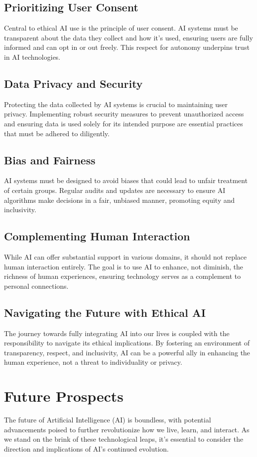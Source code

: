 \documentclass[12pt]{article}
\begin{document}
\subsection*{Prioritizing User Consent}
Central to ethical AI use is the principle of user consent. AI systems must be transparent about the data they collect and how it's used, ensuring users are fully informed and can opt in or out freely. This respect for autonomy underpins trust in AI technologies.

\subsection*{Data Privacy and Security}
Protecting the data collected by AI systems is crucial to maintaining user privacy. Implementing robust security measures to prevent unauthorized access and ensuring data is used solely for its intended purpose are essential practices that must be adhered to diligently.

\subsection*{Bias and Fairness}
AI systems must be designed to avoid biases that could lead to unfair treatment of certain groups. Regular audits and updates are necessary to ensure AI algorithms make decisions in a fair, unbiased manner, promoting equity and inclusivity.

\subsection*{Complementing Human Interaction}
While AI can offer substantial support in various domains, it should not replace human interaction entirely. The goal is to use AI to enhance, not diminish, the richness of human experiences, ensuring technology serves as a complement to personal connections.

\subsection*{Navigating the Future with Ethical AI}
The journey towards fully integrating AI into our lives is coupled with the responsibility to navigate its ethical implications. By fostering an environment of transparency, respect, and inclusivity, AI can be a powerful ally in enhancing the human experience, not a threat to individuality or privacy.

\section{Future Prospects}
The future of Artificial Intelligence (AI) is boundless, with potential advancements poised to further revolutionize how we live, learn, and interact. As we stand on the brink of these technological leaps, it's essential to consider the direction and implications of AI's continued evolution.
\end{document}
